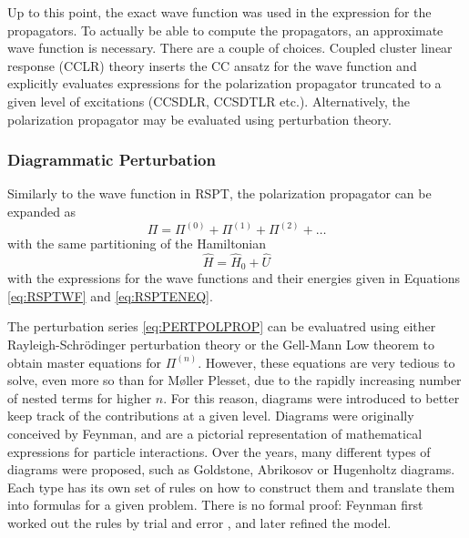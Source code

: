 Up to this point, the exact wave function was used in the expression for the propagators. To actually be able to compute the propagators, an approximate wave function is necessary. There are a couple of choices. Coupled cluster linear response (CCLR) theory inserts the CC ansatz for the wave function and explicitly evaluates expressions for the polarization propagator truncated to a given level of excitations (CCSDLR, CCSDTLR etc.). Alternatively, the polarization propagator may be evaluated using perturbation theory.

\subsubsection{Diagrammatic Perturbation}

Similarly to the wave function in RSPT, the polarization propagator can be expanded as
\begin{equation}
\Pi = \Pi^{(0)} + \Pi^{(1)} + \Pi^{(2)} + \ldots
\label{eq:PERTPOLPROP}
\end{equation}
\noindent with the same partitioning of the Hamiltonian 
\begin{equation}
\hat{H} = \hat{H}_0 + \hat{U}
\end{equation}
\noindent with the expressions for the wave functions and their energies given in Equations \ref{eq:RSPTWF} and \ref{eq:RSPTENEQ}. 

The perturbation series \ref{eq:PERTPOLPROP} can be evaluatred using either Rayleigh-Schrödinger perturbation theory or the Gell-Mann Low theorem \cite{Sch2018} to obtain master equations for $\Pi^{(n)}$. However, these equations are very tedious to solve, even more so than for M{\o}ller Plesset, due to the rapidly increasing number of nested terms for higher $n$. For this reason, diagrams were introduced to better keep track of the contributions at a given level. Diagrams were originally conceived by Feynman, and are a pictorial representation of mathematical expressions for particle interactions. Over the years, many different types of diagrams were proposed, such as Goldstone, Abrikosov or Hugenholtz diagrams. Each type has its own set of rules on how to construct them and translate them into formulas for a given problem. There is no formal proof: Feynman first worked out the rules by trial and error \cite{Fey1966}, and later refined the model.


